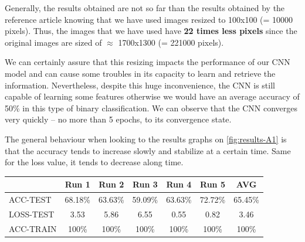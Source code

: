 \documentclass[11pt, openany]{report}
\theoremstyle{plain}
\theoremstyle{definition}
\theoremstyle{remark}
\begin{document}
Generally, the results obtained are not so far than the results obtained by the reference article \cite{leukemia} knowing that we have used images resized to 100x100 (= 10000 pixels). Thus, the images that we have used have \textbf{22 times less pixels} since the original images are sized of $\approx$ 1700x1300 (= 221000 pixels). 

We can certainly assure that this resizing impacts the performance of our CNN model and can cause some troubles in its capacity to learn and retrieve the information. Nevertheless, despite this huge inconvenience, the CNN is still capable of learning some features otherwise we would have an average accuracy of 50\% in this type of binary classification.   
We can observe that the CNN converges very quickly -- no more than 5 epochs, to its convergence state.  

The general behaviour when looking to the results graphs on \autoref{fig:results-A1} is that the accuracy tends to increase slowly and stabilize at a certain time. Same for the loss value, it tends to decrease along time.  

\vspace{1cm}


\begin{center}
\begin{tabular}{|l|c|c|c|c|c|c|}
  \hline
   & \textbf{Run 1} & \textbf{Run 2} & \textbf{Run 3} & \textbf{Run 4} & \textbf{Run 5} & \textbf{AVG}\\
  \hline
  ACC-TEST & 68.18\% & 63.63\% & 59.09\% & 63.63\% & 72.72\% & 65.45\% \\
  LOSS-TEST & 3.53 & 5.86 & 6.55 & 0.55  & 0.82 & 3.46 \\ 
  ACC-TRAIN & 100\% & 100\% & 100\% & 100\% & 100\% & 100\% \\ 
  \hline
\end{tabular}
\label{table:results-A1}
\end{center}
\end{document}
